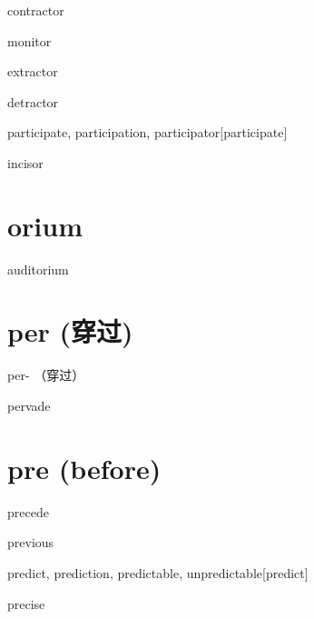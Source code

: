 \begin{wordRef}{contractor}
\end{wordRef}

\begin{wordRef}{monitor}
\end{wordRef}

\begin{wordRef}{extractor}
\end{wordRef}

\begin{wordRef}{detractor}
\end{wordRef}

\begin{wordRef}{participate, participation, participator}[participate]
\end{wordRef}

\begin{wordRef}{incisor}
\end{wordRef}

\section{orium}

\begin{wordRef}{auditorium}
\end{wordRef}

\section{per (穿过)}
{per- （穿过）}

\begin{wordRef}{pervade}
\end{wordRef}

\section{pre (before)}
\begin{wordRef}{precede}
\end{wordRef}

\begin{wordRef}{previous}
\end{wordRef}

\begin{wordRef}{predict, prediction, predictable, unpredictable}[predict]
\end{wordRef}

\begin{wordRef}{precise}
\end{wordRef}

